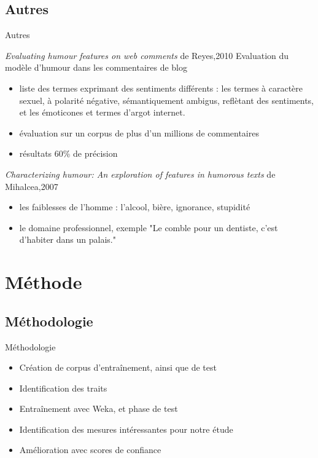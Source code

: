 \documentclass{beamer}
\begin{document}
\subsection{Autres}
\begin{frame}[allowframebreaks]{Autres}
\begin{block}{\textit{Evaluating humour features on web comments} de Reyes,2010 \cite{ReyesPRS10}}
Evaluation du modèle d'humour dans les commentaires de blog
\begin{itemize}
\item liste des termes exprimant des sentiments différents : les termes à caractère sexuel, à polarité négative, sémantiquement ambigus, reflètant des sentiments, et les émoticones et termes d’argot internet. 
\item évaluation sur un corpus de plus d’un millions de commentaires
\item résultats 60\% de précision
\end{itemize}
\end{block}

\begin{block}{\textit{Characterizing humour: An exploration of features in humorous texts} de Mihalcea,2007 \cite{MihalceaP07}}
\begin{itemize}
\item les faiblesses de l'homme : l’alcool, bière, ignorance, stupidité
\item le domaine professionnel, exemple "Le comble pour un dentiste, c’est d’habiter dans un palais."
\end{itemize}
\end{block}
\end{frame}


\section{Méthode}
\subsection{Méthodologie}
\begin{frame}{Méthodologie}

\begin{itemize}
  \item Création de corpus d'entraînement, ainsi que de test
  \item Identification des traits
  \item Entraînement avec Weka, et phase de test
  \item Identification des mesures intéressantes pour notre étude
  \item Amélioration avec scores de confiance
\end{itemize}


\end{frame}
\end{document}
